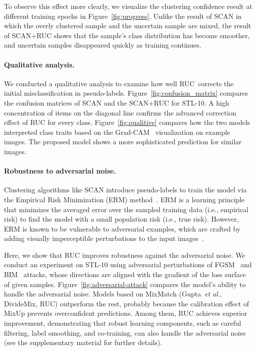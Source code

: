\documentclass[final]{cvpr}
\newcommand{\model}{\textsf{RUC}}
\newcommand{\cutparagraphup}{\vspace*{-0.15in}}
\begin{document}
To observe this effect more clearly, we visualize the clustering confidence result at different training epochs in Figure~\ref{fig:progress}.  Unlike the result of SCAN in which the overly clustered sample and the uncertain sample are mixed, the result of SCAN+\model{} shows that the sample's class distribution has become smoother, and uncertain samples disappeared quickly as training continues.




\cutparagraphup
\paragraph{Qualitative analysis.} 
We conducted a qualitative analysis to examine how well \model{}~corrects the initial misclassification in pseudo-labels. Figure~\ref{fig:confusion_matrix} compares the confusion matrices of  SCAN and the SCAN+\model{} for STL-10. A high concentration of items on the diagonal line confirms the advanced correction effect of \model{} for every class. Figure~\ref{fig:qualitive} compares how the two models interpreted class traits based on the Grad-CAM~\cite{selvaraju2017grad} visualization on example images. The proposed model shows a more sophisticated prediction for similar images.

\cutparagraphup
\paragraph{Robustness to adversarial noise.}
Clustering algorithms like SCAN introduce pseudo-labels to train the model via the Empirical Risk Minimization (ERM) method~\cite{vapnik2013nature}. ERM is a learning principle that minimizes the averaged error over the sampled training data (i.e., empirical risk) to find the model with a small population risk (i.e., true risk). However, ERM is known to be vulnerable to adversarial examples, which are crafted by adding visually imperceptible perturbations to the input images~\cite{madry2018towards,zhang2017mixup}. 

Here, we show that \model{} improves robustness against the adversarial noise. We conduct an experiment on STL-10 using adversarial perturbations of FGSM~\cite{goodfellow2014explaining} and BIM~\cite{kurakin2016adversarial} attacks, whose directions are aligned with the gradient of the loss surface of given samples. Figure~\ref{fig:adversarial-attack} compares the model's ability to handle the adversarial noise. Models based on MixMatch (Gupta~\textit{et al.}, DivideMix, \model{}) outperform the rest, probably because the calibration effect of MixUp prevents overconfident predictions. Among them, \model{} achieves superior improvement, demonstrating that robust learning components, such as careful filtering, label smoothing, and co-training, can also handle the adversarial noise (see the supplementary material for further details).
\end{document}
